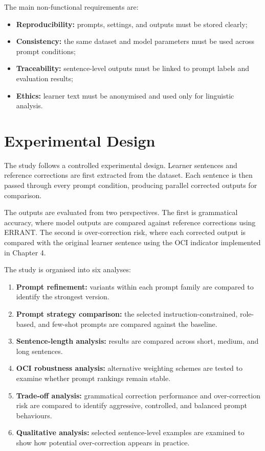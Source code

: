 The main non-functional requirements are:

\begin{itemize}
    \item \textbf{Reproducibility:} prompts, settings, and outputs must be stored clearly;
    \item \textbf{Consistency:} the same dataset and model parameters must be used across prompt conditions;
    \item \textbf{Traceability:} sentence-level outputs must be linked to prompt labels and evaluation results;
    \item \textbf{Ethics:} learner text must be anonymised and used only for linguistic analysis.
\end{itemize}

\section{Experimental Design}

The study follows a controlled experimental design. Learner sentences and reference corrections are first extracted from the dataset. Each sentence is then passed through every prompt condition, producing parallel corrected outputs for comparison.

The outputs are evaluated from two perspectives. The first is grammatical accuracy, where model outputs are compared against reference corrections using ERRANT. The second is over-correction risk, where each corrected output is compared with the original learner sentence using the OCI indicator implemented in Chapter 4.

The study is organised into six analyses:

\begin{enumerate}
    \item \textbf{Prompt refinement:} variants within each prompt family are compared to identify the strongest version.
    \item \textbf{Prompt strategy comparison:} the selected instruction-constrained, role-based, and few-shot prompts are compared against the baseline.
    \item \textbf{Sentence-length analysis:} results are compared across short, medium, and long sentences.
    \item \textbf{OCI robustness analysis:} alternative weighting schemes are tested to examine whether prompt rankings remain stable.
    \item \textbf{Trade-off analysis:} grammatical correction performance and over-correction risk are compared to identify aggressive, controlled, and balanced prompt behaviours.
    \item \textbf{Qualitative analysis:} selected sentence-level examples are examined to show how potential over-correction appears in practice.
\end{enumerate}

